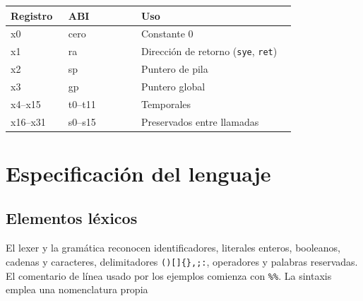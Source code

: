 \begin{longtable}[]{@{}p{0.190\linewidth}p{0.240\linewidth}p{0.510\linewidth}@{}}
\toprule\noalign{}
Registro & ABI & Uso \\
\midrule\noalign{}
\endhead
\bottomrule\noalign{}
\endlastfoot
x0 & cero & Constante 0 \\
x1 & ra & Dirección de retorno (\texttt{sye},
\texttt{ret}) \\
x2 & sp & Puntero de pila \\
x3 & gp & Puntero global \\
x4--x15 & t0--t11 & Temporales \\
x16--x31 & s0--s15 & Preservados entre llamadas \\
\end{longtable}

\section{Especificación del lenguaje}\label{4-especificaciuxf3n-del-lenguaje-de-entrada-bal--apartado-82}

\subsection{Elementos léxicos}\label{41-elementos-luxe9xicos}

El lexer y la gramática reconocen identificadores, literales enteros,
booleanos, cadenas y caracteres, delimitadores
\texttt{()[]\{\},;:}, operadores y palabras reservadas.
El comentario de línea usado por los ejemplos comienza con
\texttt{\%\%}. La sintaxis emplea una nomenclatura propia

